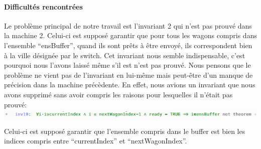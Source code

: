 \paragraph{Difficultés rencontrées}

Le problème principal de notre travail est l'invariant 2 qui n'est pas prouvé dans la machine 2. Celui-ci est supposé garantir que pour tous
les wagons compris dans l'ensemble ``ensBuffer'', quand ils sont prêts à être envoyé, ils correspondent bien à la ville désignée par le switch.
Cet invariant nous semble indispensable, c'est pourquoi nous l'avons laissé même s'il est n'est pas prouvé. Nous pensons que le problème ne vient
pas de l'invariant en lui-même mais peut-être d'un manque de précision dans la machine précèdente. En effet, nous avions un invariant que nous avons
supprimé sans avoir compris les raisons pour lesquelles il n'était pas prouvé: \includegraphics[scale=0.5]{../images/invariant.png}

Celui-ci est supposé garantir que l'ensemble compris dans le buffer est bien les indices compris entre ``currentIndex'' et ``nextWagonIndex''.
